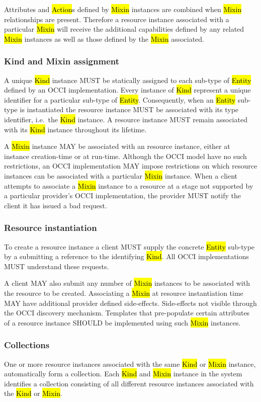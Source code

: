 \documentclass[10pt,a4paper,british]{article}
\begin{document}
Attributes and \hl{Action}s defined by \hl{Mixin} instances are combined when
\hl{Mixin} relationships are present. Therefore a resource instance associated
with a particular \hl{Mixin} will receive the additional capabilities defined
by any related \hl{Mixin} instances as well as those defined by the \hl{Mixin}
associated.

\subsubsection{Kind and Mixin assignment}
\label{sec:assignment}
A unique \hl{Kind} instance MUST be statically assigned to each sub-type of
\hl{Entity} defined by an OCCI implementation. Every instance of \hl{Kind}
represent a unique identifier for a particular sub-type of \hl{Entity}.
Consequently, when an \hl{Entity} sub-type is instantiated the resource instance
MUST be associated with its type identifier, i.e.~the \hl{Kind} instance.
A resource instance MUST remain associated with its \hl{Kind} instance throughout
its lifetime.

A \hl{Mixin} instance MAY be associated with an resource instance, either at
instance creation-time or at run-time. Although the OCCI model have no such
restrictions, an OCCI implementation MAY impose restrictions on which resource
instances can be associated with a particular \hl{Mixin} instance.
%
When a client attempts to associate a \hl{Mixin} instance to a resource at a
stage not supported by a particular provider's OCCI implementation, the
provider MUST notify the client it has issued a bad request.

\subsubsection{Resource instantiation}
\label{sec:instantiation}
To create a resource instance a client MUST supply the concrete \hl{Entity}
sub-type by a submitting a reference to the identifying \hl{Kind}.
All OCCI implementations MUST understand these requests.

A client MAY also submit any number of \hl{Mixin} instances to be associated
with the resource to be created. Associating a \hl{Mixin} at resource
instantiation time MAY have additional provider defined side-effects.
Side-effects not visible through the OCCI discovery mechanism. Templates that
pre-populate certain attributes of a resource instance SHOULD be implemented
using such \hl{Mixin} instances.

\subsubsection{Collections}
\label{sec:collection}
One or more resource instances associated with the same \hl{Kind} or \hl{Mixin}
instance, automatically form a collection.
Each \hl{Kind} and \hl{Mixin} instance in the system identifies a collection
consisting of all different resource instances associated with the \hl{Kind} or
\hl{Mixin}.
\end{document}
